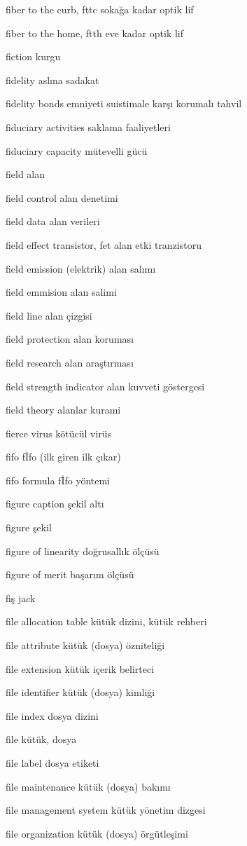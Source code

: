 \documentclass[12pt,fleqn]{article}\usepackage{../../common}
\begin{document}
fiber to the curb, fttc sokağa kadar optik lif

fiber to the home, ftth eve kadar optik lif

fiction kurgu

fidelity aslına sadakat

fidelity bonds emniyeti suistimale karşı korumalı tahvil

fiduciary activities saklama faaliyetleri

fiduciary capacity mütevelli gücü

field alan

field control alan denetimi

field data alan verileri

field effect transistor, fet alan etki tranzistoru

field emission (elektrik) alan salımı

field emmision alan salimi

field line alan çizgisi

field protection alan koruması

field research alan araştırması

field strength indicator alan kuvveti göstergesi

field theory alanlar kurami

fierce virus kötücül virüs

fifo fİfo (ilk giren ilk çıkar)

fifo formula fİfo yöntemi

figure caption şekil altı

figure şekil

figure of linearity doğrusallık ölçüsü

figure of merit başarım ölçüsü

fiş jack

file allocation table kütük dizini, kütük rehberi

file attribute kütük (dosya) özniteliği

file extension kütük içerik belirteci

file identifier kütük (dosya) kimliği

file index dosya dizini

file kütük, dosya

file label dosya etiketi

file maintenance kütük (dosya) bakımı

file management system kütük yönetim dizgesi

file organization kütük (dosya) örgütleşimi
\end{document}
